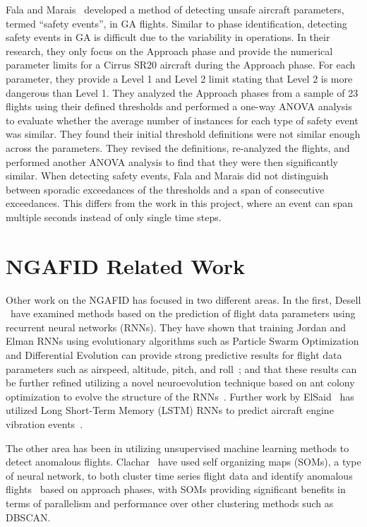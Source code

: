     Fala and Marais~\cite{fala2016detecting} developed a method of detecting unsafe aircraft parameters, termed ``safety events'', in GA flights.  Similar to phase identification, detecting safety events in GA is difficult due to the variability in operations.  In their research, they only focus on the Approach phase and provide the numerical parameter limits for a Cirrus SR20 aircraft during the Approach phase.  For each parameter, they provide a Level 1 and Level 2 limit stating that Level 2 is more dangerous than Level 1.  They analyzed the Approach phases from a sample of 23 flights using their defined thresholds and performed a one-way ANOVA analysis to evaluate whether the average number of instances for each type of safety event was similar.  They found their initial threshold definitions were not similar enough across the parameters.  They revised the definitions, re-analyzed the flights, and performed another ANOVA analysis to find that they were then significantly similar.  When detecting safety events, Fala and Marais did not distinguish between sporadic exceedances of the thresholds and a span of consecutive exceedances.  This differs from the work in this project, where an event can span multiple seconds instead of only single time steps.
	

\section{NGAFID Related Work}

	Other work on the NGAFID has focused in two different areas.  In the first, Desell \etal\ have examined methods based on the prediction of flight data parameters using recurrent neural networks (RNNs).  They have shown that training Jordan and Elman RNNs using evolutionary algorithms such as Particle Swarm Optimization and Differential Evolution can provide strong predictive results for flight data parameters such as airspeed, altitude, pitch, and roll~\cite{desell2014evolving}; and that these results can be further refined utilizing a novel neuroevolution technique based on ant colony optimization to evolve the structure of the RNNs~\cite{desell2015evolving}. Further work by ElSaid \etal\ has utilized Long Short-Term Memory (LSTM) RNNs to predict aircraft engine vibration events~\cite{elsaid2016vibration,elsaid2016thesis}.
    
    The other area has been in utilizing unsupervised machine learning methods to detect anomalous flights.  Clachar \etal\ have used self organizing maps (SOMs), a type of neural network, to both cluster time series flight data and identify anomalous flights~\cite{sophine2014identifying,sophine2016phd} based on approach phases, with SOMs providing significant benefits in terms of parallelism and performance over other clustering methods such as DBSCAN.



